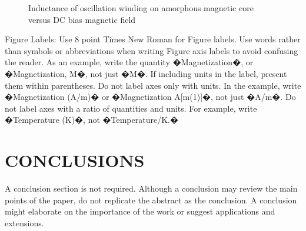 \documentclass[a4paper, 10pt, conference]{ieeeconf}      %
\begin{document}
   \begin{figure}[thpb]
      \centering
      \caption{Inductance of oscillation winding on amorphous
       magnetic core versus DC bias magnetic field}
      \label{figurelabel}
   \end{figure}
   

Figure Labels: Use 8 point Times New Roman for Figure labels. Use words rather than symbols or abbreviations when writing Figure axis labels to avoid confusing the reader. As an example, write the quantity �Magnetization�, or �Magnetization, M�, not just �M�. If including units in the label, present them within parentheses. Do not label axes only with units. In the example, write �Magnetization (A/m)� or �Magnetization {A[m(1)]}�, not just �A/m�. Do not label axes with a ratio of quantities and units. For example, write �Temperature (K)�, not �Temperature/K.�

\section{CONCLUSIONS}

A conclusion section is not required. Although a conclusion may review the main points of the paper, do not replicate the abstract as the conclusion. A conclusion might elaborate on the importance of the work or suggest applications and extensions. 

\addtolength{\textheight}{-12cm}   %




\end{document}
